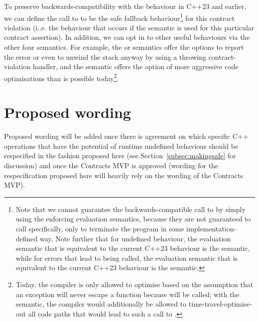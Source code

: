 To preserve backwards-compatibility with the behaviour in C++23 and earlier, we can define the call to  to be the safe fallback behaviour\footnote{Note that we cannot guarantee the backwards-compatible call to  by simply using the enforcing evaluation semantics, because they are not guaranteed to call  specifically, only to terminate the program in some implementation-defined way. Note further that for undefined behaviour, the evaluation semantic that is equivalent to the current C++23 behaviour is the  semantic, while for errors that lead to  being called, the evaluation semantic that is equivalent to the current C++23 behaviour is the  semantic.} for this contract violation (i..e. the behaviour that occurs if the  semantic is used for this particular contract assertion). In addition, we can opt in to other useful behaviours via the other four semantics. For example, the  or  semantics offer the options to report the error or even to unwind the stack anyway by using a throwing contract-violation handler, and the  semantic offers the option of more aggressive code optimisations than is possible today\footnote{Today, the compiler is only allowed to optimise based on the assumption that an exception will never escape a  function because  will be called; with the  semantic, the compiler would additionally be allowed to time-travel-optimise-out all code paths that would lead to such a call to .}.

\section{Proposed wording}

Proposed wording will be added once there is agreement on which specific C++ operations that have the potential of runtime undefined behaviour should be respecified in the fashion proposed here (see Section~\ref{subsec:makingsafe} for discussion) and once the Contracts MVP is approved (wording for the respecification proposed here will heavily rely on the wording of the Contracts MVP).





\pagebreak %

\renewcommand{\bibname}{References}




